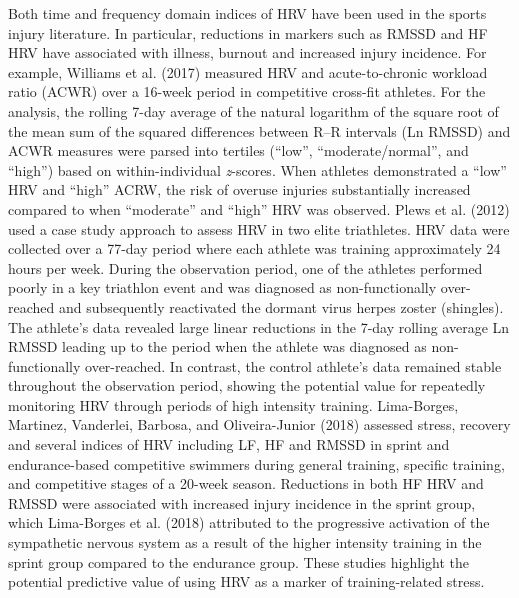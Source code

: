\documentclass[man,floatsintext]{apa6}
\begin{document}
Both time and frequency domain indices of HRV have been used in the sports injury literature.
In particular, reductions in markers such as RMSSD and HF HRV have associated with illness, burnout and increased injury incidence.
For example, Williams et al. (2017) measured HRV and acute-to-chronic workload ratio (ACWR) over a 16-week period in competitive cross-fit athletes.
For the analysis, the rolling 7-day average of the natural logarithm of the square root of the mean sum of the squared differences between R--R intervals (Ln RMSSD) and ACWR measures were parsed into tertiles (\enquote{low}, \enquote{moderate/normal}, and \enquote{high}) based on within-individual \emph{z}-scores.
When athletes demonstrated a \enquote{low} HRV and \enquote{high} ACRW, the risk of overuse injuries substantially increased compared to when \enquote{moderate} and \enquote{high} HRV was observed.
Plews et al. (2012) used a case study approach to assess HRV in two elite triathletes.
HRV data were collected over a 77-day period where each athlete was training approximately 24 hours per week.
During the observation period, one of the athletes performed poorly in a key triathlon event and was diagnosed as non-functionally over-reached and subsequently reactivated the dormant virus herpes zoster (shingles).
The athlete's data revealed large linear reductions in the 7-day rolling average Ln RMSSD leading up to the period when the athlete was diagnosed as non-functionally over-reached.
In contrast, the control athlete's data remained stable throughout the observation period, showing the potential value for repeatedly monitoring HRV through periods of high intensity training.
Lima-Borges, Martinez, Vanderlei, Barbosa, and Oliveira-Junior (2018) assessed stress, recovery and several indices of HRV including LF, HF and RMSSD in sprint and endurance-based competitive swimmers during general training, specific training, and competitive stages of a 20-week season.
Reductions in both HF HRV and RMSSD were associated with increased injury incidence in the sprint group, which Lima-Borges et al. (2018) attributed to the progressive activation of the sympathetic nervous system as a result of the higher intensity training in the sprint group compared to the endurance group.
These studies highlight the potential predictive value of using HRV as a marker of training-related stress.
\end{document}
